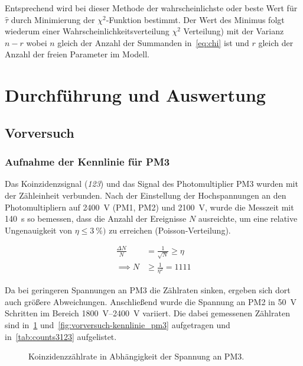 \documentclass[slug=LM, room=Andreas-Schubert-Bau\,\ K\ 1A, supervisor=Anne-Sophie\ Berthold, coursedate=13.\ 12.\ 2019]{../../Lab_Report_LaTeX/lab_report}
\begin{document}
Entsprechend wird bei dieser Methode der wahrscheinlichste oder beste Wert für \(\hat\tau\) durch
Minimierung der \(\chi^2\)-Funktion bestimmt. Der Wert des Minimus
folgt wiederum einer Wahrscheinlichkeitsverteilung \(\chi^2\)
Verteilung) mit der Varianz \(n-r\) wobei \(n\) gleich der Anzahl der
Summanden in~\ref{eq:chi} ist und \(r\) gleich der Anzahl der freien
Parameter im Modell.

\section{Durchf\"uhrung und Auswertung}
\label{sec:durchaus}

\subsection{Vorversuch}
\label{sec:vorvers}
\subsubsection{Aufnahme der Kennlinie f\"ur PM3}
\label{sec:pm3kenn}

Das Koinzidenzsignal (\textit{123}) und das Signal des
Photomultiplier PM3 wurden mit der Z\"ahleinheit verbunden.  Nach der
Einstellung der Hochspannungen an den Photomultipliern auf
\SI{2400}{\volt} (PM1, PM2) und \SI{2100}{\volt}, wurde die Messzeit
mit \SI{140}{\second} so bemessen, dass die Anzahl der Ereignisse
\(N\) ausreichte, um eine relative Ungenauigkeit von
\(\eta \leq \SI{3}{\percent})\) zu erreichen (Poisson-Verteilung).

\begin{align}
\label{eq:mtime}
\frac{\Delta N}{N} &= \frac{1}{\sqrt{N}} \geq \eta \\
\implies N &\geq \frac{1}{\eta^2} = 1111
\end{align}

Da bei geringeren Spannungen an PM3 die Z\"ahlraten sinken, ergeben
sich dort auch gr\"o\ss{}ere Abweichungen.  Anschließend wurde die
Spannung an PM2 in \SI{50}{\volt} Schritten im Bereich
\SIrange{1800}{2400}{\volt} variiert.  Die dabei gemessenen
Z\"ahlraten sind in~\ref{fig:vorversuch-kennlinie_123}
und~\ref{fig:vorversuch-kennlinie_pm3} aufgetragen und
in~\ref{tab:counts3123} aufgelistet.

\begin{figure}[h]\centering
  
  \caption{Koinzidenzz\"ahlrate in Abh\"angigkeit der Spannung an PM3.}
  \label{fig:vorversuch-kennlinie_123}
\end{figure}
\end{document}
